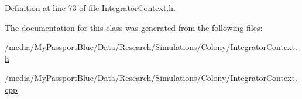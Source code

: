 \-Definition at line 73 of file \-Integrator\-Context.\-h.



\-The documentation for this class was generated from the following files\-:\begin{DoxyCompactItemize}
\item 
/media/\-My\-Passport\-Blue/\-Data/\-Research/\-Simulations/\-Colony/\hyperlink{_integrator_context_8h}{\-Integrator\-Context.\-h}\item 
/media/\-My\-Passport\-Blue/\-Data/\-Research/\-Simulations/\-Colony/\hyperlink{_integrator_context_8cpp}{\-Integrator\-Context.\-cpp}\end{DoxyCompactItemize}
